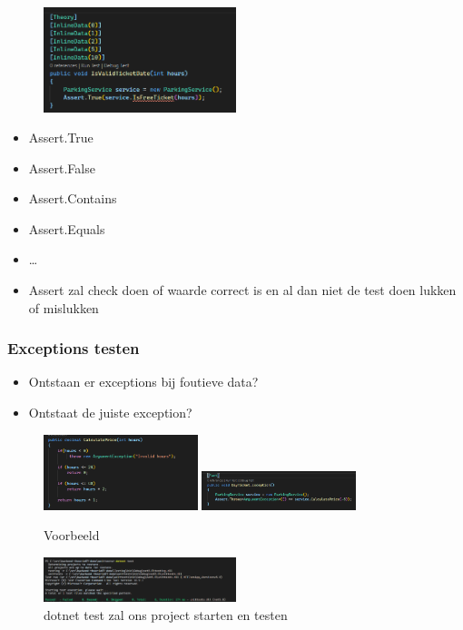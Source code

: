\documentclass{article}
\begin{document}
\begin{figure}[H]
    \centering
    \includegraphics[width=0.5\textwidth]{unit-test2.png}
    \caption{}
\end{figure}

\begin{itemize}
    \item Assert.True
    \item Assert.False
    \item Assert.Contains
    \item Assert.Equals
    \item \dots
    \item Assert zal check doen of waarde correct is en al dan niet de test doen lukken of mislukken
\end{itemize}

\subsubsection{Exceptions testen}

\begin{itemize}
    \item Ontstaan er exceptions bij foutieve data?
    \item Ontstaat de juiste exception?
\end{itemize}

\begin{figure}[H]
    \centering
    \includegraphics[width=0.4\textwidth]{unit-test3.png}
    \includegraphics[width=0.4\textwidth]{unit-test4.png}
    \caption{Voorbeeld}
\end{figure}

\begin{figure}[H]
    \centering
    \includegraphics[width=0.5\textwidth]{dotnet-test.png}
    \caption{dotnet test zal ons project starten en testen}
\end{figure}
\end{document}
